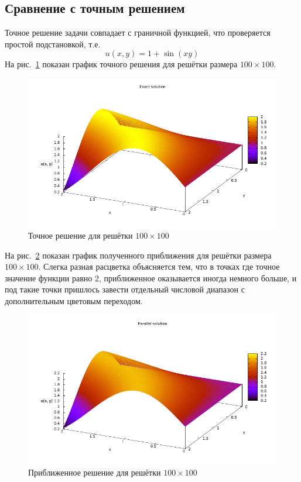 \documentclass[12pt,notitlepage,oneside]{extarticle}
\begin{document}
\newpage
\subsection{Сравнение с точным решением}
Точное решение задачи совпадает с граничной функцией, что проверяется простой
подстановкой, т.е.
\[
  u(x, y) = 1 + \sin(xy)
\]
На рис.~\ref{exact:image} показан график точного решения для решётки размера
$100 \times 100$.

\begin{figure}[h]
  \centering
  \includegraphics[scale=1.3]{correct_sol.pdf}
  \caption{Точное решение для решётки $100 \times 100$}
  \label{exact:image}
\end{figure}

На рис.~\ref{parallel:image} показан график полученного приближения для решётки
размера $100 \times 100$. Слегка разная расцветка объясняется тем, что в точках
где точное значение функции равно 2, приближенное оказывается иногда немного
больше, и под такие точки пришлось завести отдельный числовой диапазон с
дополнительным цветовым переходом.

\begin{figure}[h]
  \centering
  \includegraphics[scale=1.3]{mine_sol.pdf}
  \caption{Приближенное решение для решётки $100 \times 100$}
  \label{parallel:image}
\end{figure}
\end{document}
